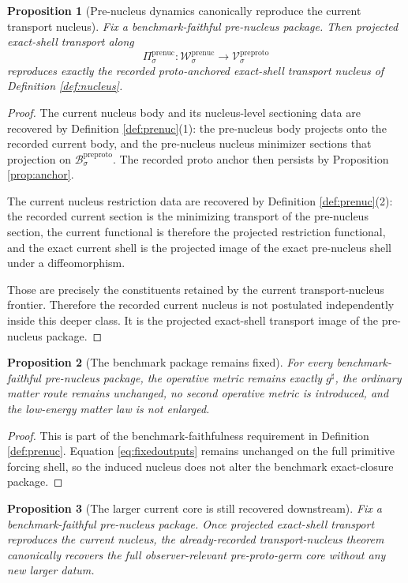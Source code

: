 \documentclass[11pt]{article}
\newcommand{\CompletedMetric}{g^{\sharp}}
\newcommand{\PreProtoSpace}[1]{\mathcal V_{#1}^{\mathrm{preproto}}}
\newcommand{\PreProtoBody}[1]{\mathcal B_{#1}^{\mathrm{preproto}}}
\newcommand{\PreNucSpace}[1]{\mathcal W_{#1}^{\mathrm{prenuc}}}
\newcommand{\PreNucProj}[1]{\Pi_{#1}^{\mathrm{prenuc}}}
\newtheorem{proposition}{Proposition}
\begin{document}
\begin{proposition}[Pre-nucleus dynamics canonically reproduce the current transport nucleus]
\label{prop:nucleus}
Fix a benchmark-faithful pre-nucleus package. Then projected exact-shell transport along
\[
\PreNucProj{\sigma}:\PreNucSpace{\sigma}\to\PreProtoSpace{\sigma}
\]
reproduces exactly the recorded proto-anchored exact-shell transport nucleus of Definition \ref{def:nucleus}.
\end{proposition}

\begin{proof}
The current nucleus body and its nucleus-level sectioning data are recovered by Definition \ref{def:prenuc}(1): the pre-nucleus body projects onto the recorded current body, and the pre-nucleus nucleus minimizer sections that projection on \(\PreProtoBody{\sigma}\). The recorded proto anchor then persists by Proposition \ref{prop:anchor}.

The current nucleus restriction data are recovered by Definition \ref{def:prenuc}(2): the recorded current section is the minimizing transport of the pre-nucleus section, the current functional is therefore the projected restriction functional, and the exact current shell is the projected image of the exact pre-nucleus shell under a diffeomorphism.

Those are precisely the constituents retained by the current transport-nucleus frontier. Therefore the recorded current nucleus is not postulated independently inside this deeper class. It is the projected exact-shell transport image of the pre-nucleus package.
\end{proof}

\begin{proposition}[The benchmark package remains fixed]
\label{prop:boundary}
For every benchmark-faithful pre-nucleus package, the operative metric remains exactly \(\CompletedMetric\), the ordinary matter route remains unchanged, no second operative metric is introduced, and the low-energy matter law is not enlarged.
\end{proposition}

\begin{proof}
This is part of the benchmark-faithfulness requirement in Definition \ref{def:prenuc}. Equation \eqref{eq:fixedoutputs} remains unchanged on the full primitive forcing shell, so the induced nucleus does not alter the benchmark exact-closure package.
\end{proof}

\begin{proposition}[The larger current core is still recovered downstream]
\label{prop:downstream}
Fix a benchmark-faithful pre-nucleus package. Once projected exact-shell transport reproduces the current nucleus, the already-recorded transport-nucleus theorem canonically recovers the full observer-relevant pre-proto-germ core without any new larger datum.
\end{proposition}
\end{document}
